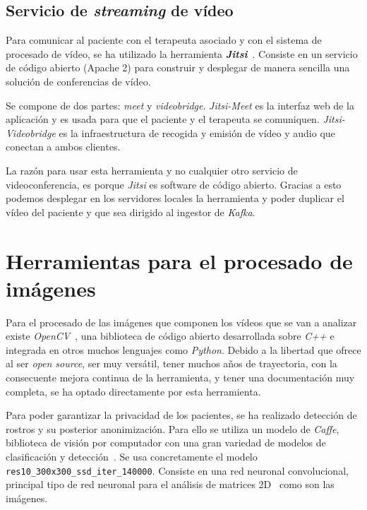 \subsection{Servicio de \textit{streaming} de vídeo}

Para comunicar al paciente con el terapeuta asociado y con el sistema de procesado de vídeo, se ha utilizado la herramienta \textit{\textbf{Jitsi}}~\cite{tool:jitsi}. Consiste en un servicio de código abierto (Apache 2) para construir y desplegar de manera sencilla una solución de conferencias de vídeo.

Se compone de dos partes: \textit{meet} y \textit{videobridge}. \textit{Jitsi-Meet} es la interfaz web de la aplicación y es usada para que el paciente y el terapeuta se comuniquen. \textit{Jitsi-Videobridge} es la infraestructura de recogida y emisión de vídeo y audio que conectan a ambos clientes.

La razón para usar esta herramienta y no cualquier otro servicio de videoconferencia, es porque \textit{Jitsi} es software de código abierto. Gracias a esto podemos desplegar en los servidores locales la herramienta y poder duplicar el vídeo del paciente y que sea dirigido al ingestor de \textit{Kafka}.

\section{Herramientas para el procesado de imágenes}

Para el procesado de las imágenes que componen los vídeos que se van a analizar existe \textit{OpenCV}~\cite{opencv_library}, una biblioteca de código abierto desarrollada sobre \textit{C++} e integrada en otros muchos lenguajes como \textit{Python}. Debido a la libertad que ofrece al ser \textit{open source}, ser muy versátil, tener muchos años de trayectoria, con la consecuente mejora continua de la herramienta, y tener una documentación muy completa, se ha optado directamente por esta herramienta.

Para poder garantizar la privacidad de los pacientes, se ha realizado detección de rostros y su posterior anonimización. Para ello se utiliza un modelo de \textit{Caffe}, biblioteca de visión por computador con una gran variedad de modelos de clasificación y detección~\cite{jia2014caffe}. Se usa concretamente el modelo \texttt{res10\_300x300\_ssd\_iter\_140000}. Consiste en una red neuronal convolucional, principal tipo de red neuronal para el análisis de matrices 2D~\cite{lawrence1997face} como son las imágenes.


